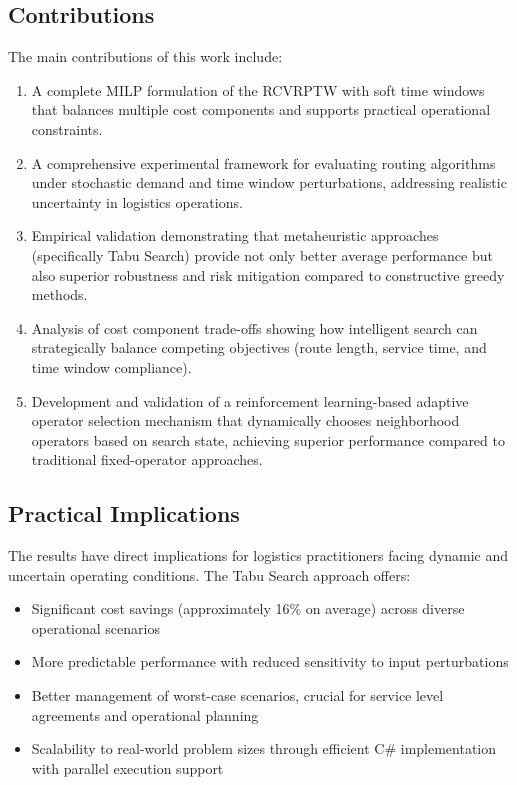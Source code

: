 \subsection{Contributions}

The main contributions of this work include:
\begin{enumerate}
    \item A complete MILP formulation of the RCVRPTW with soft time windows that balances multiple cost components and supports practical operational constraints.
    \item A comprehensive experimental framework for evaluating routing algorithms under stochastic demand and time window perturbations, addressing realistic uncertainty in logistics operations.
    \item Empirical validation demonstrating that metaheuristic approaches (specifically Tabu Search) provide not only better average performance but also superior robustness and risk mitigation compared to constructive greedy methods.
    \item Analysis of cost component trade-offs showing how intelligent search can strategically balance competing objectives (route length, service time, and time window compliance).
    \item Development and validation of a reinforcement learning-based adaptive operator selection mechanism that dynamically chooses neighborhood operators based on search state, achieving superior performance compared to traditional fixed-operator approaches.
\end{enumerate}

\subsection{Practical Implications}

The results have direct implications for logistics practitioners facing dynamic and uncertain operating conditions. The Tabu Search approach offers:
\begin{itemize}
    \item Significant cost savings (approximately 16\% on average) across diverse operational scenarios
    \item More predictable performance with reduced sensitivity to input perturbations
    \item Better management of worst-case scenarios, crucial for service level agreements and operational planning
    \item Scalability to real-world problem sizes through efficient C\# implementation with parallel execution support
\end{itemize}

